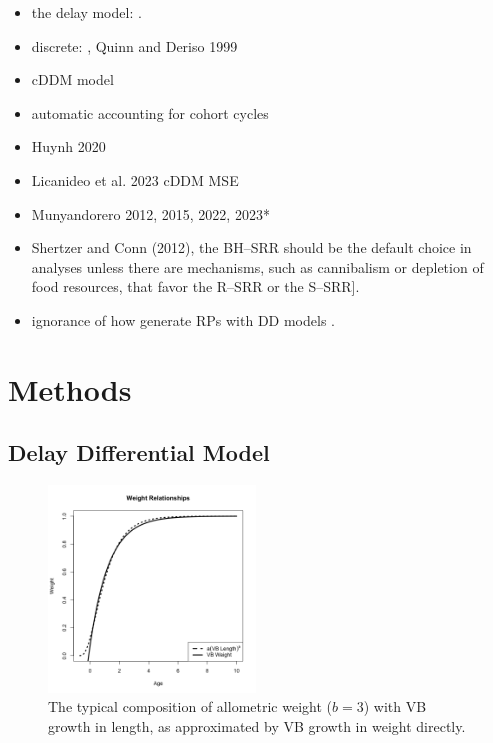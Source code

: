 \begin{itemize}
\item the delay model: \cite{schnute_general_1985} \cite{schnute_general_1987} \cite{fournier_length-based_1987}.
\item discrete: \cite[pg. 334]{hilborn_quantitative_1992}, Quinn and Deriso 1999
\item \cite{walters_continuous_2020} cDDM model
\item automatic accounting for cohort cycles
\item Huynh 2020
\item Licanideo et al. 2023 cDDM MSE 
\item Munyandorero 2012, 2015, 2022, 2023*
\item Shertzer and Conn (2012), the BH–SRR should be the default choice in analyses unless there are mechanisms, such as cannibalism or depletion of food resources, that favor the R–SRR or the S–SRR].
\item ignorance of how generate RPs with DD models \cite{munyandorero_analytical_2023}.
\end{itemize}

%
\section{Methods}

%
\subsection{Delay Differential Model}

%
\begin{figure} %
\vspace{-1cm}
\includegraphics[width=0.49\textwidth]{plots/vbOpt.png}
\vspace{-1cm}
\caption{
The typical composition of allometric weight ($b=3$) with VB growth in length, as
approximated by VB growth in weight directly.
}
\label{SrrPT}
\end{figure}

